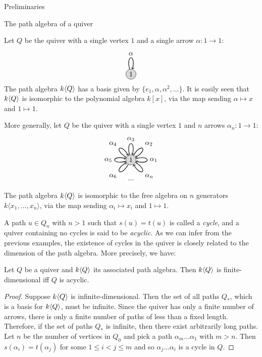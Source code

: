 \begin{chapter}{Preliminaries}
\begin{section}{The path algebra of a quiver}
\begin{exmp}\label{one-loop} Let $Q$ be the quiver with a single vertex $1$ and a single arrow $\alpha:1\to 1$:
\[
\begin{tikzpicture}[->, thick]
\tikzset{every loop/.style={looseness=15}}
\node[circle, fill=gray!30, minimum size=.5cm, inner sep=.07cm, draw=black, thin]  (1) {1};
\path (1) edge [loop above] node {$\alpha$} (1);
\end{tikzpicture}
\]
The path algebra $k\langle Q\rangle$ has a basis given by $\{e_1, \alpha, \alpha^2, \dots\}$. It is easily seen that $k\langle Q\rangle$ is isomorphic to the polynomial algebra $k[x]$, via the map sending $\alpha \mapsto x$ and $1\mapsto 1$.
\end{exmp}
\begin{exmp}\label{several-loops} More generally, let $Q$ be the quiver with a single vertex $1$ and $n$ arrows $\alpha_n:1\to 1$:
\[
\begin{tikzpicture}[->, auto, thick]
\tikzset{every loop/.style={looseness=15}}
\node[circle, fill=gray!30, minimum size=.5cm, inner sep=.07cm, draw=black, thin]  (1) {1};
\node[circle, fill=white] (2) at +(270: 1) {...};
\path (1) edge [loop left] node {$\alpha_5$} (1);
\path (1) edge [loop above] node {$\alpha_3$} (1);
\path (1) edge [loop right] node {$\alpha_1$} (1);
\path (1) edge [in=30, out=60, loop] node {$\alpha_2$} (1);
\path (1) edge [in=210, out=240, loop] node {$\alpha_6$} (1);
\path (1) edge [in=120, out=150, loop] node {$\alpha_4$} (1);
\path (1) edge [in=300, out=330, loop] node {$\alpha_n$} (1);
\end{tikzpicture}
\]
The path algebra $k\langle Q\rangle$ is isomorphic to the free algebra on $n$ generators $k\langle x_1,\dots, x_n\rangle$, via the map sending $\alpha_i\mapsto x_i$ and $1\mapsto 1$.
\end{exmp}

A path $u\in Q_n$ with $n>1$ such that $s(u)=t(u)$ is called a \emph{cycle}, and a quiver containing no cycles is said to be \emph{acyclic}. As we can infer from the previous examples, the existence of cycles in the quiver is closely related to the dimension of the path algebra. More precisely, we have:

\begin{prop}\label{acyclic-fin-dim}
Let $Q$ be a quiver and $k\langle Q\rangle$ its associated path algebra. Then $k\langle Q\rangle$ is finite-dimensional iff $Q$ is acyclic.
\end{prop}
\begin{proof} Suppose $k\langle Q\rangle$ is infinite-dimensional. Then the set of all paths $Q_*$, which is a basis for $k\langle Q\rangle$, must be infinite. Since the quiver has only a finite number of arrows, there is only a finite number of paths of less than a fixed length. Therefore, if the set of paths $Q_*$ is infinite, then there exist arbitrarily long paths. Let $n$ be the number of vertices in $Q_0$ and pick a path $\alpha_m\dots\alpha_1$ with $m>n$. Then $s(\alpha_i) = t(\alpha_j)$ for some $1\leq i < j\leq m$ and so $\alpha_j\dots\alpha_i$ is a cycle in $Q$.


\end{proof}
\end{section}
\end{chapter}

